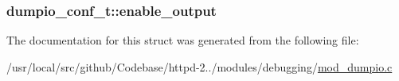 \subsubsection[{\texorpdfstring{enable\+\_\+output}{enable_output}}]{ dumpio\+\_\+conf\+\_\+t\+::enable\+\_\+output}\hypertarget{structdumpio__conf__t_aadc464945664855d396b4b2629ab23cc}{}\label{structdumpio__conf__t_aadc464945664855d396b4b2629ab23cc}


The documentation for this struct was generated from the following file\+:\begin{DoxyCompactItemize}
\item 
/usr/local/src/github/\+Codebase/httpd-\/2../modules/debugging/\hyperlink{mod__dumpio_8c}{mod\+\_\+dumpio.\+c}\end{DoxyCompactItemize}
